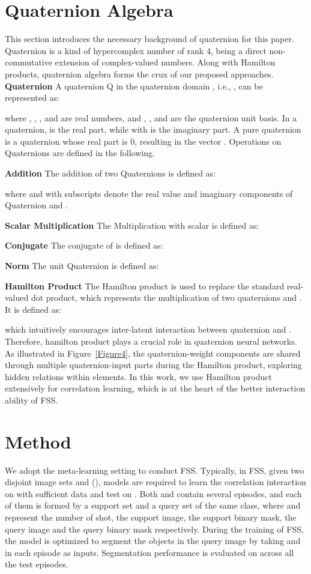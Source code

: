 \documentclass[lettersize,journal]{IEEEtran}
\begin{document}
\section{Quaternion Algebra}
This section introduces the necessary background of quaternion for this paper. Quaternion is a kind of hypercomplex number of rank 4, being a direct non-commutative extension of complex-valued numbers. Along with Hamilton products, quaternion algebra forms the crux of our proposed approaches.
\textbf{Quaternion} A quaternion Q in the quaternion domain , i.e., , can be represented as:  


\noindent where , , , and  are real numbers, and , , and  are the quaternion unit basis. In a quaternion,  is the real part, while  with  is the imaginary part. A pure quaternion is a quaternion whose real part is 0,  resulting in the vector . Operations on Quaternions are defined in the following.

\noindent \textbf{Addition} The addition of two Quaternions is defined as:



\noindent where  and  with subscripts denote the real value and imaginary components of Quaternion  and .

\noindent\textbf{Scalar Multiplication} The Multiplication with scalar  is defined as:



\noindent\textbf{Conjugate} The conjugate  of  is defined as:


\noindent\textbf{Norm} The unit Quaternion  is defined as:


\noindent\textbf{Hamilton Product}
The Hamilton product is used to replace the standard real-valued dot product, which represents the multiplication of two quaternions  and . It is defined as:

\noindent which intuitively encourages inter-latent interaction between quaternion  and . Therefore, hamilton product plays a crucial role in quaternion neural networks. As illustrated in Figure~\ref{Figure4}, the quaternion-weight components are shared through multiple quaternion-input parts during the Hamilton product, exploring hidden relations within elements. In this work, we use Hamilton product extensively for correlation learning, which is at the heart of the better interaction ability of FSS.


\section{Method}
We adopt the meta-learning setting to conduct FSS. Typically, in FSS, given two disjoint image sets  and  (), models are required to learn the correlation interaction on  with sufficient data and test on . Both  and  contain several episodes, and each of them is formed by a support set  and a query set  of the same class, where  and  represent the number of shot, the support image, the support binary mask, the query image and the query binary mask respectively. During the training of FSS, the model is optimized to segment the objects in the query image  by taking  and    in each episode  as inputs. Segmentation performance is evaluated on  across all the test episodes. 
\end{document}
